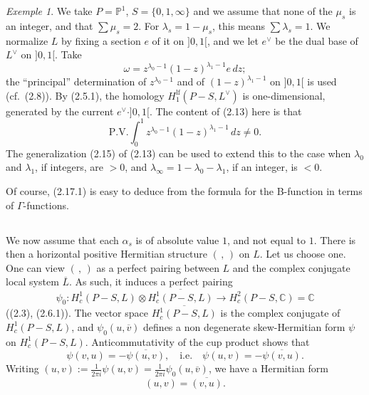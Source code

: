 \documentclass[12pt,a4paper]{article}
\theoremstyle{plain}
\theoremstyle{definition}
\theoremstyle{remark}
\newtheorem{example}[theorem]{Exemple}
\newcommand{\CC}{\mathbb{C}}
\newcommand{\PP}{\mathbb{P}}
\numberwithin{equation}{section}
\providecommand{\CC}{\mathbb{C}}
\providecommand{\PP}{\mathbb{P}}
\begin{document}
\begin{example}\label{ex:2.17}
We take $P = \PP^1$, $S = \{0, 1, \infty\}$ and we assume that none of the $\mu_s$ is an integer, and that $\sum \mu_s = 2$. For $\lambda_s = 1 - \mu_s$, this means $\sum \lambda_s = 1$. We normalize $L$ by fixing a section $e$ of it on $]0, 1[$, and we let $e^\vee$ be the dual base of $L^\vee$ on $]0, 1[$. Take
\[
\omega = z^{\lambda_0-1} (1-z)^{\lambda_1-1} e \, dz;
\]
the ``principal'' determination of $z^{\lambda_0-1}$ and of $(1-z)^{\lambda_1-1}$ on $]0, 1[$ is used (cf.\ (2.8)). By (2.5.1), the homology $H^{\mathrm{lf}}_1(P-S, L^\vee)$ is one-dimensional, generated by the current $e^\vee \cdot ]0, 1[$. The content of (2.13) here is that
\begin{equation}\label{eq:2.17.1}
\mathrm{P.V.} \int_0^1 z^{\lambda_0-1} (1-z)^{\lambda_1-1} \, dz \neq 0.
\end{equation}
The generalization (2.15) of (2.13) can be used to extend this to the case when $\lambda_0$ and $\lambda_1$, if integers, are $> 0$, and $\lambda_\infty = 1 - \lambda_0 - \lambda_1$, if an integer, is $< 0$.

Of course, (2.17.1) is easy to deduce from the formula for the B-function in terms of $\Gamma$-functions.
\end{example}

\subsection{}
We now assume that each $\alpha_s$ is of absolute value $1$, and not equal to $1$. There is then a horizontal positive Hermitian structure $(\,,\,)$ on $L$. Let us choose one. One can view $(\,,\,)$ as a perfect pairing between $L$ and the complex conjugate local system $\overline{L}$. As such, it induces a perfect pairing
\[
\psi_0: H^1_c(P-S, L) \otimes \overline{H^1_c(P-S, L)} \to H^2_c(P-S, \CC) = \CC
\]
((2.3), (2.6.1)). The vector space $\overline{H^1_c(P-S, L)}$ is the complex conjugate of $H^1_c(P-S, L)$, and $\psi_0(u, \overline{v})$ defines a non degenerate skew-Hermitian form $\psi$ on $H^1_c(P-S, L)$. Anticommutativity of the cup product shows that
\begin{equation}\label{eq:2.18.1}
\psi(v, u) = -\overline{\psi(u, v)}, \quad \text{i.e.}\quad \psi(u, v) = -\overline{\psi(v, u)}.
\end{equation}
Writing $(u, v) := \frac{1}{2\pi i} \psi(u, v) = \frac{1}{2\pi i} \psi_0(u, \overline{v})$, we have a Hermitian form
\begin{equation}\label{eq:2.18.2}
(u, v) = \overline{(v, u)}.
\end{equation}
\end{document}
